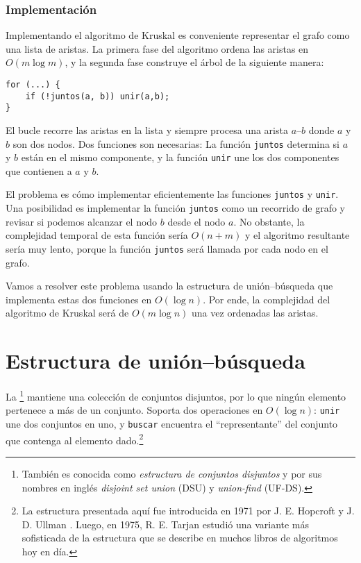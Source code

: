 \subsubsection{Implementación}

Implementando el algoritmo de Kruskal es conveniente representar
el grafo como una lista de aristas. La primera fase del algoritmo
ordena las aristas en $O(m \log m)$, y la segunda fase construye el
árbol de la siguiente manera:
\begin{lstlisting}
for (...) {
    if (!juntos(a, b)) unir(a,b);
}
\end{lstlisting}

El bucle recorre las aristas en la lista y siempre procesa una
arista $a$--$b$ donde $a$ y $b$ son dos nodos. Dos funciones son
necesarias: La función \texttt{juntos} determina si $a$ y $b$ están
en el mismo componente, y la función \texttt{unir} une los dos
componentes que contienen a $a$ y $b$.

El problema es cómo implementar eficientemente las funciones
\texttt{juntos} y \texttt{unir}. Una posibilidad es implementar
la función \texttt{juntos} como un recorrido de grafo y revisar si
podemos alcanzar el nodo $b$ desde el nodo $a$. No obstante, la
complejidad temporal de esta función sería $O(n+m)$ y el algoritmo
resultante sería muy lento, porque la función \texttt{juntos} será
llamada por cada nodo en el grafo.

Vamos a resolver este problema usando la estructura de unión--búsqueda
que implementa estas dos funciones en $O(\log n)$. Por ende, la
complejidad del algoritmo de Kruskal será de $O(m \log n)$ una vez
ordenadas las aristas.

\section{Estructura de unión--búsqueda}


La \footnote{También es conocida
    como \textit{estructura de conjuntos disjuntos} y
    por sus nombres en inglés \textit{disjoint set union} (DSU) y
    \textit{union-find} (UF-DS).} mantiene una colección de conjuntos
disjuntos, por lo que ningún elemento pertenece a más de un conjunto.
Soporta dos operaciones en $O(\log n)$: \texttt{unir} une dos
conjuntos en uno, y \texttt{buscar} encuentra el ``representante''
del conjunto que contenga al elemento dado.\footnote{La estructura
    presentada aquí fue introducida en 1971 por J. E. Hopcroft y
    J. D. Ullman \cite{hop71}. Luego, en 1975, R. E. Tarjan estudió
    una variante más sofisticada de la estructura \cite{tar75} que se
    describe en muchos libros de algoritmos hoy en día.}

